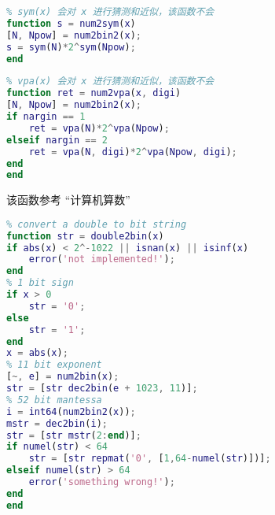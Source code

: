 \begin{lstlisting}[language=matlab, caption=num2sym.m]
% 双精度转换为符号表达式
% sym(x) 会对 x 进行猜测和近似，该函数不会
function s = num2sym(x)
[N, Npow] = num2bin2(x);
s = sym(N)*2^sym(Npow);
end
\end{lstlisting}

\begin{lstlisting}[language=matlab, caption=num2vpa.m]
% 双精度转换为变精度浮点数
% vpa(x) 会对 x 进行猜测和近似，该函数不会
function ret = num2vpa(x, digi)
[N, Npow] = num2bin2(x);
if nargin == 1
    ret = vpa(N)*2^vpa(Npow);
elseif nargin == 2
    ret = vpa(N, digi)*2^vpa(Npow, digi);
end
end
\end{lstlisting}

该函数参考 “计算机算数”
\begin{lstlisting}[language=matlab, caption=double2bin.m]
% 把一个双精度数转换为 '0' '1' 字符串
% convert a double to bit string
function str = double2bin(x)
if abs(x) < 2^-1022 || isnan(x) || isinf(x)
    error('not implemented!');
end
% 1 bit sign
if x > 0
    str = '0';
else
    str = '1';
end
x = abs(x);
% 11 bit exponent
[~, e] = num2bin(x);
str = [str dec2bin(e + 1023, 11)];
% 52 bit mantessa
i = int64(num2bin2(x));
mstr = dec2bin(i);
str = [str mstr(2:end)];
if numel(str) < 64
    str = [str repmat('0', [1,64-numel(str)])];
elseif numel(str) > 64
    error('something wrong!');
end
end
\end{lstlisting}
